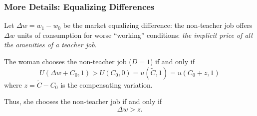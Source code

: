 \documentclass[10pt,letterpaper,subeqn]{beamer}
\begin{document}
\begin{frame}
  \frametitle{More Details: Equalizing Differences}
  Let $\Delta w = w_1 - w_0$ be the market equalizing difference: the non-teacher job offers $\Delta w$ units of consumption for worse ``working'' conditions: \emph{the implicit price of all the amenities of a teacher job}. \vspace{4mm}

  The woman chooses the non-teacher job ($D=1$) if and only if
  \[
    U(\Delta w + C_0,1)>U(C_0,0)=u(\widetilde{C},1)=u(C_0 + z, 1)
  \]
  where $z = \widetilde{C} - C_0$ is the compensating variation.

  \vspace{4mm}
  Thus, she chooses the non-teacher job if and only if
  \[
    \Delta w > z.
    \]
    
\hyperlink{equalizingDiff}{}
\end{frame}
\end{document}
